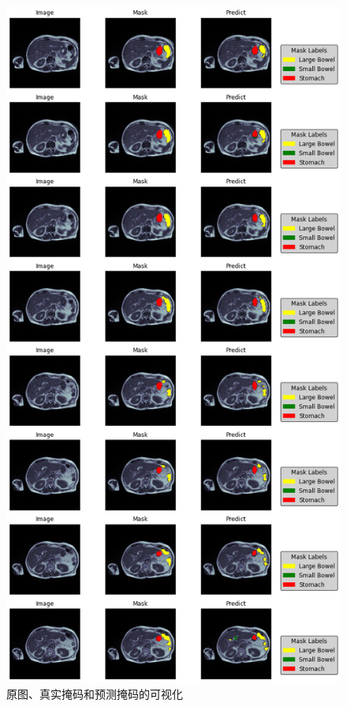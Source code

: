 \documentclass[letterpaper, 10pt, conference, twoside]{ieeeconf}
\begin{document}
\begin{figure}[htbp]
  \centering
  \includegraphics[width = 1\linewidth]{predict_visual.png}
  \caption{原图、真实掩码和预测掩码的可视化}
  \label{fig:fig11}
\end{figure}
\end{document}
